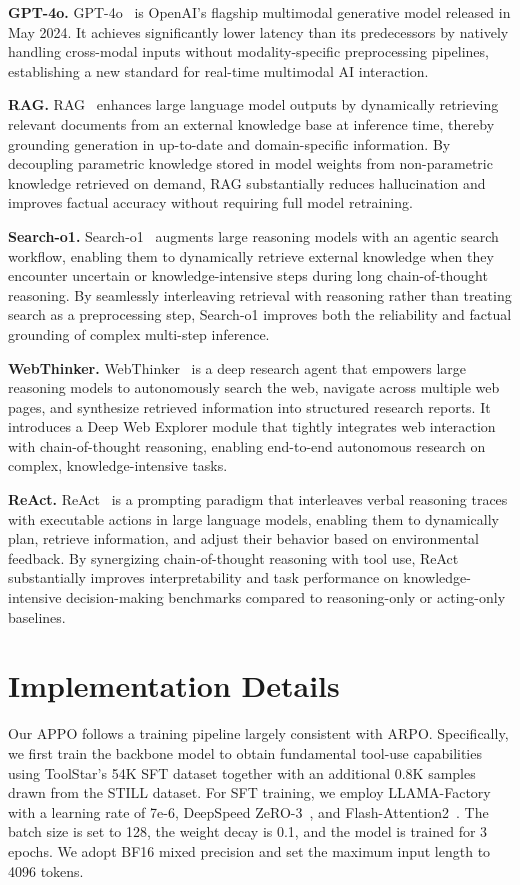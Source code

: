 \documentclass{llmxive}
\begin{document}
\noindent\textbf{GPT-4o.} GPT-4o~\cite{hurst2024gpt} is OpenAI's flagship multimodal generative model released in May 2024. It achieves significantly lower latency than its predecessors by natively handling cross-modal inputs without modality-specific preprocessing pipelines, establishing a new standard for real-time multimodal AI interaction.

\noindent\textbf{RAG.} RAG~\cite{lewis2020retrieval} enhances large language model outputs by dynamically retrieving relevant documents from an external knowledge base at inference time, thereby grounding generation in up-to-date and domain-specific information. By decoupling parametric knowledge stored in model weights from non-parametric knowledge retrieved on demand, RAG substantially reduces hallucination and improves factual accuracy without requiring full model retraining.

\noindent\textbf{Search-o1.} Search-o1~\cite{li2025search} augments large reasoning models with an agentic search workflow, enabling them to dynamically retrieve external knowledge when they encounter uncertain or knowledge-intensive steps during long chain-of-thought reasoning. By seamlessly interleaving retrieval with reasoning rather than treating search as a preprocessing step, Search-o1 improves both the reliability and factual grounding of complex multi-step inference.

\noindent\textbf{WebThinker.} WebThinker~\cite{li2025webthinker} is a deep research agent that empowers large reasoning models to autonomously search the web, navigate across multiple web pages, and synthesize retrieved information into structured research reports. It introduces a Deep Web Explorer module that tightly integrates web interaction with chain-of-thought reasoning, enabling end-to-end autonomous research on complex, knowledge-intensive tasks.

\noindent\textbf{ReAct.} ReAct~\cite{yao2022react} is a prompting paradigm that interleaves verbal reasoning traces with executable actions in large language models, enabling them to dynamically plan, retrieve information, and adjust their behavior based on environmental feedback. By synergizing chain-of-thought reasoning with tool use, ReAct substantially improves interpretability and task performance on knowledge-intensive decision-making benchmarks compared to reasoning-only or acting-only baselines.
 

\section{Implementation Details}\label{appx:c}
Our APPO follows a training pipeline largely consistent with ARPO. Specifically, we first train the backbone model to obtain fundamental tool-use capabilities using ToolStar's 54K SFT dataset together with an additional 0.8K samples drawn from the STILL dataset. For SFT training, we employ LLAMA-Factory~\cite{zheng2024llamafactory} with a learning rate of 7e-6, DeepSpeed ZeRO-3~\cite{rasley2020deepspeed}, and Flash-Attention2~\cite{dao2023flashattention}. The batch size is set to 128, the weight decay is 0.1, and the model is trained for 3 epochs. We adopt BF16 mixed precision and set the maximum input length to 4096 tokens.
\end{document}
